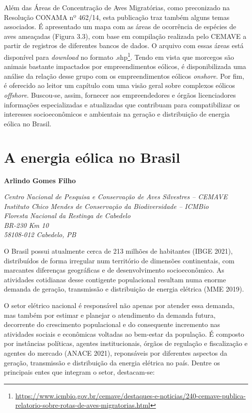 \documentclass[
  oneside]{scrbook}
\DeclareRobustCommand{\href}[2]{#2\footnote{\url{#1}}}
\begin{document}
Além das Áreas de Concentração de Aves Migratórias, como preconizado na Resolução CONAMA nº 462/14, esta publicação traz também alguns temas associados. É apresentado um mapa com as áreas de ocorrência de espécies de aves ameaçadas (Figura 3.3), com base em compilação realizada pelo CEMAVE a partir de registros de diferentes bancos de dados. O arquivo com essas áreas está \href{https://www.icmbio.gov.br/cemave/destaques-e-noticias/240-cemave-publica-relatorio-sobre-rotas-de-aves-migratorias.html}{disponível para \emph{download} no formato .shp}. Tendo em vista que morcegos são animais bastante impactados por empreendimentos eólicos, é disponibilizada uma análise da relação desse grupo com os empreendimentos eólicos \emph{onshore}. Por fim, é oferecido ao leitor um capítulo com uma visão geral sobre complexos eólicos \emph{offshore}. Buscou-se, assim, fornecer aos empreendedores e órgãos licenciadores informações especializadas e atualizadas que contribuam para compatibilizar os interesses socioeconômicos e ambientais na geração e distribuição de energia eólica no Brasil.

\hypertarget{cap1}{%
\chapter{A energia eólica no Brasil}\label{cap1}}

\pagestyle{headings}

\textbf{Arlindo Gomes Filho}

\emph{Centro Nacional de Pesquisa e Conservação de Aves Silvestres -- CEMAVE}\\
\emph{Instituto Chico Mendes de Conservação da Biodiversidade -- ICMBio}\\
\emph{Floresta Nacional da Restinga de Cabedelo}\\
\emph{BR-230 Km 10}\\
\emph{58108-012 Cabedelo, PB}

O Brasil possui atualmente cerca de 213 milhões de habitantes (IBGE 2021), distribuídos de forma irregular num território de dimensões continentais, com marcantes diferenças geográficas e de desenvolvimento socioeconômico. As atividades cotidianas desse contigente populacional resultam numa enorme demanda de geração, transmissão e distribuição de energia elétrica (MME 2019).

O setor elétrico nacional é responsável não apenas por atender essa demanda, mas também por estimar e planejar o atendimento da demanda futura, decorrente do crescimento populacional e do consequente incremento nas atividades sociais e econômicas voltadas ao bem-estar da população. É composto por instâncias políticas, agentes institucionais, órgãos de regulação e fiscalização e agentes do mercado (ANACE 2021), reponsáveis por diferentes aspectos da geração, transmissão e distribuição da energia elétrica no país. Dentre os principais entes que integram o setor, destacam-se:
\end{document}
